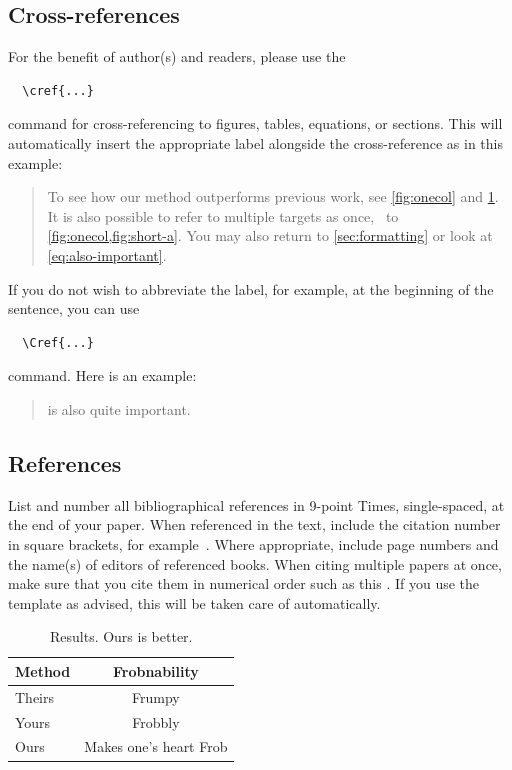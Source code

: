 \subsection{Cross-references}

For the benefit of author(s) and readers, please use the
{\small\begin{verbatim}
  \cref{...}
\end{verbatim}}  command for cross-referencing to figures, tables, equations, or sections.
This will automatically insert the appropriate label alongside the cross-reference as in this example:
\begin{quotation}
  To see how our method outperforms previous work, see \cref{fig:onecol} and \cref{tab:example}.
  It is also possible to refer to multiple targets as once, \eg~to \cref{fig:onecol,fig:short-a}.
  You may also return to \cref{sec:formatting} or look at \cref{eq:also-important}.
\end{quotation}
If you do not wish to abbreviate the label, for example, at the beginning of the sentence, you can use
{\small\begin{verbatim}
  \Cref{...}
\end{verbatim}}
command. Here is an example:
\begin{quotation}
   is also quite important.
\end{quotation}

\subsection{References}

List and number all bibliographical references in 9-point Times, single-spaced, at the end of your paper.
When referenced in the text, include the citation number in square brackets, for
example~\cite{Authors14}.
Where appropriate, include page numbers and the name(s) of editors of referenced books.
When citing multiple papers at once, make sure that you cite them in numerical order such as this \cite{Alpher02,Alpher03,Alpher05,Authors14b,Authors14}.
If you use the template as advised, this will be taken care of automatically.

\begin{table}
  \caption{Results.   Ours is better.}
  \label{tab:example}
  \centering
  \begin{tabular}{@{}lc@{}}
    \toprule
    Method & Frobnability \\
    \midrule
    Theirs & Frumpy \\
    Yours & Frobbly \\
    Ours & Makes one's heart Frob\\
    \bottomrule
  \end{tabular}
\end{table}

